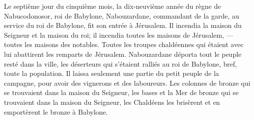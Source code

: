 Le septième jour du cinquième mois,
		la dix-neuvième année du règne de Nabucodonosor, roi de Babylone,
	Nabouzardane, commandant de la garde, au service du roi de Babylone,
	fit son entrée à Jérusalem.
Il incendia la maison du Seigneur et la maison du roi;
	il incendia toutes les maisons de Jérusalem, --- toutes les maisons des notables.
Toutes les troupes chaldéennes qui étaient avec lui abattirent les remparts de Jérusalem.
Nabouzardane déporta tout le peuple resté dans la ville,
	les déserteurs qui s’étaient ralliés au roi de Babylone,
	bref, toute la population.
Il laissa seulement une partie du petit peuple de la campagne,
	pour avoir des vignerons et des laboureurs.
Les colonnes de bronze qui se trouvaient dans la maison du Seigneur,
	les bases et la Mer de bronze qui se trouvaient dans la maison du Seigneur,
	les Chaldéens les brisèrent et en emportèrent le bronze à Babylone.
